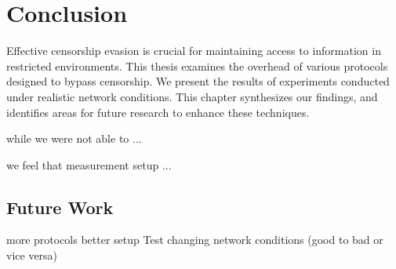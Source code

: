 
\chapter{Conclusion}
\label{chap:conclusion}

Effective censorship evasion is crucial for maintaining access to information in restricted environments.
This thesis examines the overhead of various protocols designed to bypass censorship.
We present the results of experiments conducted under realistic network conditions.
This chapter synthesizes our findings, and identifies areas for future research to enhance these techniques.


while we were not able to ...

we feel that measurement setup ...

\section{Future Work}
more protocols
better setup
Test changing network conditions (good to bad or vice versa)
